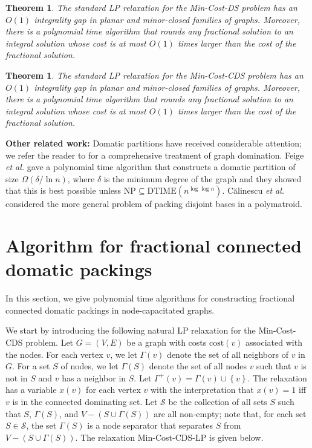 \documentclass[11pt]{article}
\newtheorem{theorem}[lemma]{Theorem}
\def\etal{\emph{et al.}\xspace}
\def\script#1{\mathcal{#1}}
\def\set#1{\left\{#1\right\}}
\def\sS{\script{S}}
\def\mypar#1{{\medskip\noindent \textbf{#1}}}
\def\prob#1{\textsf{\textup{#1}}\xspace}
\def\minCDSlp{\prob{\minCDS-LP}}
\def\NP{\mathrm{NP}}
\def\DTIME{\mathrm{DTIME}}
\def\minCDS{\prob{Min-Cost-CDS}}
\def\minDS{\prob{Min-Cost-DS}}
\def\cost{\mathrm{cost}}
\begin{document}
\begin{theorem} \label{thm:ds-gap-minor-free}
	The standard LP relaxation for the \minDS problem has an $O(1)$
	integrality gap in planar and minor-closed families of graphs.
	Moreover, there is a polynomial time algorithm that rounds any
	fractional solution to an integral solution whose cost is at most
	$O(1)$ times larger than the cost of the fractional solution.
\end{theorem}

\begin{theorem} \label{thm:cds-gap-minor-free}
	The standard LP relaxation for the \minCDS problem has an $O(1)$
	integrality gap in planar and minor-closed families of graphs.
	Moreover, there is a polynomial time algorithm that rounds any
	fractional solution to an integral solution whose cost is at most
	$O(1)$ times larger than the cost of the fractional solution.
\end{theorem}

\vspace{-0.1in}
\mypar{Other related work:}
Domatic partitions have received considerable attention; we refer the
reader to \cite{HedetniemiL91, HaynesHS98a, HaynesHS98b} for a
comprehensive treatment of graph domination. Feige \etal
\cite{FeigeHKS02} gave a polynomial time algorithm that constructs a
domatic partition of size $\Omega(\delta/\ln{n})$, where $\delta$ is
the minimum degree of the graph and they showed that this is best
possible unless $\NP \subseteq \DTIME\left(n^{\log\log{n}}\right)$.
C\u{a}linescu \etal \cite{CalinescuCV09} considered the more general
problem of packing disjoint bases in a polymatroid.


\section{Algorithm for fractional connected domatic packings}
\label{sec:cds-packing}

In this section, we give polynomial time algorithms for constructing
fractional connected domatic packings in node-capacitated graphs.

We start by introducing the following natural LP relaxation for the
\minCDS problem. Let $G = (V, E)$ be a graph with costs $\cost(v)$
associated with the nodes. For each vertex $v$, we let $\Gamma(v)$
denote the set of all neighbors of $v$ in $G$. For a set $S$ of
nodes, we let $\Gamma(S)$ denote the set of all nodes $v$ such that
$v$ is not in $S$ and $v$ has a neighbor in $S$.  Let $\Gamma^+(v) =
\Gamma(v) \cup \set{v}$. The relaxation has a variable $x(v)$ for
each vertex $v$ with the interpretation that $x(v) = 1$ iff $v$ is in
the connected dominating set. Let $\sS$ be the collection of all sets
$S$ such that $S$, $\Gamma(S)$, and $V - (S \cup \Gamma(S))$ are all
non-empty; note that, for each set $S \in \sS$, the set $\Gamma(S)$
is a node separator that separates $S$ from $V - (S \cup \Gamma(S))$.
The relaxation \minCDSlp is given below.
\end{document}

